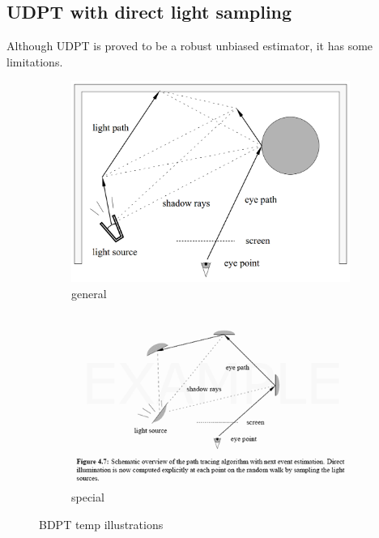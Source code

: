 \subsection{UDPT with direct light sampling}
Although \gls{UDPT} is proved to be a robust unbiased estimator, it has some
limitations.
\begin{figure}
    \centering
    \begin{subfigure}{0.45\textwidth}
        \includegraphics[width=\textwidth]{imgs/schemes/generalized_BDPT_lafortune}
        \caption{general}
        \label{fig:bdptgeneral}
    \end{subfigure}
    \begin{subfigure}{0.45\textwidth}
        \includegraphics[width=\textwidth]{imgs/schemes/PT2_resize}
        \caption{special}
        \label{fig:udpt_ptdl}
    \end{subfigure}

    \caption{BDPT temp illustrations}
    \label{fig:bdpt}
\end{figure}


